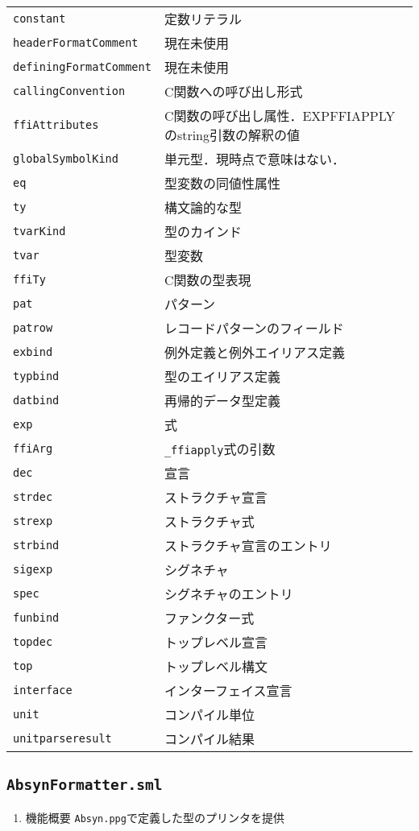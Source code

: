 \documentclass{jbook}
\newcommand{\code}[1]{\mbox{\large\tt #1}}
\begin{document}
\begin{enumerate}
\begin{tabular}{ll}
\code{constant} & 定数リテラル \\
\code{headerFormatComment} & 現在未使用\\
\code{definingFormatComment} & 現在未使用\\
\code{callingConvention} & C関数への呼び出し形式\\
\code{ffiAttributes} & C関数の呼び出し属性．EXPFFIAPPLYのstring引数の解釈の値\\
\code{globalSymbolKind} & 単元型．現時点で意味はない．\\
\code{eq} & 型変数の同値性属性\\
\code{ty} & 構文論的な型\\
\code{tvarKind} & 型のカインド\\
\code{tvar} & 型変数\\
\code{ffiTy} & C関数の型表現\\
\code{pat} & パターン\\
\code{patrow} & レコードパターンのフィールド\\
\code{exbind} & 例外定義と例外エイリアス定義\\
\code{typbind}  & 型のエイリアス定義\\
\code{datbind}  & 再帰的データ型定義\\
\code{exp} & 式\\
\code{ffiArg}  & \code{\_ffiapply}式の引数\\
\code{dec}  & 宣言\\
\code{strdec}  & ストラクチャ宣言\\
\code{strexp}  & ストラクチャ式\\
\code{strbind}  & ストラクチャ宣言のエントリ\\
\code{sigexp}  & シグネチャ\\
\code{spec} & シグネチャのエントリ\\
\code{funbind}  & ファンクター式\\
\code{topdec}  & トップレベル宣言\\
\code{top}  & トップレベル構文\\
\code{interface}  & インターフェイス宣言\\
\code{unit} & コンパイル単位\\
\code{unitparseresult} &  コンパイル結果
\end{tabular}
\end{enumerate}
	
\subsection{\code{AbsynFormatter.sml}}
\begin{enumerate}
\item 機能概要 \code{Absyn.ppg}で定義した型のプリンタを提供
\end{enumerate}
\end{document}
